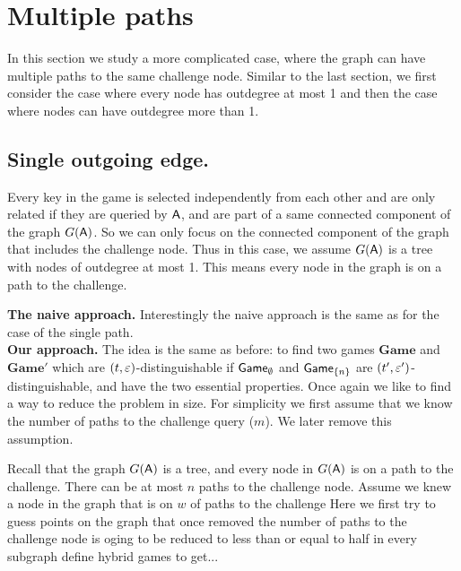 \documentclass{article}
\def\A{{\sf A}}
\newcommand{\game}{{\sf Game}}
\newcommand{\dgame}{{\mathbf{Game}}}
\newcommand{\dgg}[2]{\game_{#1}^{#2}}
\begin{document}
\section{Multiple paths}

In this section we study a more complicated case, where the graph can have multiple paths to the same challenge node. Similar to the last section, we first consider the case where every node has outdegree at most 1 and then the case where nodes can have outdegree more than 1.

\subsection{Single outgoing edge.}
Every key in the game is selected independently from each other and are only related if they are queried by $\A$, and are part of a same connected component of the graph $G(\A)$. So we can only focus on the connected component of the graph that includes the challenge node. Thus in this case, we assume $G(\A)$ is a tree with nodes of outdegree at most 1. This means every node in the graph is on a path to the challenge. 

\noindent \textbf{The naive approach.} Interestingly the naive approach is the same as for the case of the single path. \\

\noindent \textbf{Our approach.}
The idea is the same as before: to find two games $\dgame$ and $\dgame'$ which are $(t,\varepsilon)$-distinguishable if $\game_{\emptyset}$ and $\game_{\{n\}}$ are $(t',\varepsilon')$-distinguishable, and have the two essential properties. Once again we like to find a way to reduce the problem in size. For simplicity we first assume that we know the number of paths to the challenge query ($m$). We later remove this assumption. 

Recall that the graph $G(\A)$ is a tree, and every node in $G(\A)$ is on a path to the challenge. There can be at most $n$ paths to the challenge node. Assume we knew a node in the graph that is on $w$ of paths to the challenge 
Here we first try to guess points on the graph that once removed the number of paths to the challenge node is oging to be reduced to less than or equal to half in every subgraph  define hybrid games to get...

\iffalse To explain our method in details, we define a series of games, $\dgg{I}{P}$. The difference in these games is in the nodes on the path that are guessed and also the nodes where the real answer is replaced with a fake one. In all these games the challenge query is responded to with a real answer and the fake responses are a subset of guessed node and the first and last node on the path. 
\fi
\end{document}
